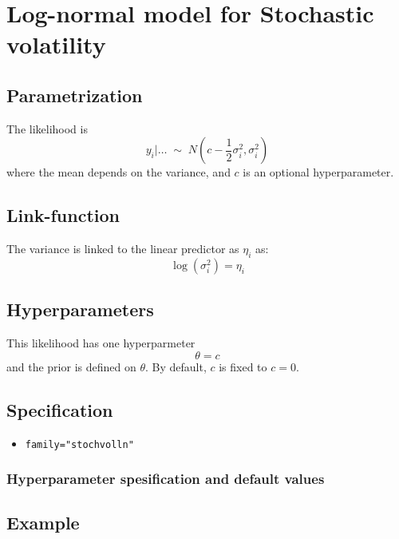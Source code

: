 \documentclass[a4paper,11pt]{article}
\begin{document}
\section*{Log-normal model for Stochastic volatility}

\subsection*{Parametrization}

The likelihood is
\[
y_i |\ldots \;\sim\; N(c - \frac{1}{2} \sigma^{2}_i, \sigma^{2}_i)
\]
where the mean depends on the variance, and $c$ is an optional
hyperparameter.

\subsection*{Link-function}

The variance is linked to the linear predictor as
$\eta_i$ as:
\[
\log (\sigma^{2}_i) = \eta_i
\]

\subsection*{Hyperparameters}

This likelihood has one hyperparmeter
\begin{displaymath}
    \theta = c
\end{displaymath}
and the prior is defined on $\theta$. By default, $c$ is fixed to $c=0$.

\subsection*{Specification}

\begin{itemize}
\item \texttt{family="stochvolln"}
\end{itemize}

\subsubsection*{Hyperparameter spesification and default values}


\subsection*{Example}

\end{document}
